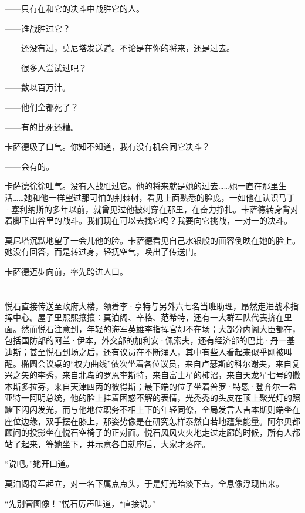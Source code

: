 \documentclass[AutoFakeBold=true]{book}
\begin{document}
{\kaishu ——只有在和它的决斗中战胜它的人。}

{\kaishu ——谁战胜过它？}

{\kaishu ——还没有过，}莫尼塔发送道。{\kaishu 不论是在你的将来，还是过去。}

{\kaishu ——很多人尝试过吧？}

{\kaishu ——数以百万计。}

{\kaishu ——他们全都死了？}

{\kaishu ——有的比死还糟。}

卡萨德吸了口气。{\kaishu 你知不知道，我有没有机会同它决斗？}

{\kaishu ——会有的。}

卡萨德徐徐吐气。没有人战胜过它。他的将来就是她的过去……她一直在那里生活……她和他一样望过那可怕的荆棘树，看见上面熟悉的脸庞，一如他在认识马丁·塞利纳斯的多年以前，就曾见过他被刺穿在那里，在奋力挣扎。卡萨德转身背对着脚下山谷里的战斗。{\kaishu 我们现在可以去找它吗？我要向它挑战，一对一的决斗。}

莫尼塔沉默地望了一会儿他的脸。卡萨德看见自己水银般的面容倒映在她的脸上。她没有回答，而是转过身，轻抚空气，唤出了传送门。

卡萨德迈步向前，率先跨进人口。

\chapter{}

悦石直接传送至政府大楼，领着李·亨特与另外六七名当班助理，昂然走进战术指挥中心。屋子里熙熙攘攘：莫泊阁、辛格、范希特，还有一大群军队代表挤在里面。然而悦石注意到，年轻的海军英雄李指挥官却不在场；大部分内阁大臣都在，包括国防部的阿兰·伊本，外交部的加利安·佩索夫，还有经济部的巴比·丹一基迪斯；甚至悦石到场之后，还有议员在不断涌入，其中有些人看起来似乎刚被叫醒。椭圆会议桌的``权力曲线''依次坐着各位议员，来自卢瑟斯的科尔谢夫，来自复兴之矢的李秀，来自北岛的罗恩奎斯特，来自富士星的柿沼，来自天龙星七号的撒本斯多拉芬，来自天津四丙的彼得斯；最下端的位子坐着普罗·特恩·登齐尔一希亚特一阿明总统，他的脸上挂着困惑不解的表情，光秃秃的头皮在顶上聚光灯的照耀下闪闪发光，而与他地位职务不相上下的年轻同僚，全局发言人吉本斯则端坐在座位边缘，双手摆在膝上，那姿势像是在研究怎样泰然自若地蕴集能量。阿尔贝都顾问的投影坐在悦石空椅子的正对面。悦石风风火火地走过走廊的时候，所有人都站了起来，等她坐下，并示意各自就座后，大家才落座。

``说吧。''她开口道。

莫泊阁将军起立，对一名下属点点头，于是灯光暗淡下去，全息像浮现出来。

``先别管图像！''悦石厉声叫道，``直接{\kaishu 说}。''
\end{document}
